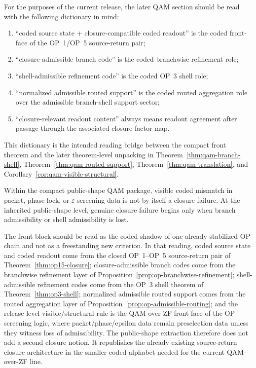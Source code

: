 \begin{remark}\label{rem:public-shape-reading-guide}
For the purposes of the current release, the later QAM section should be read with the following dictionary in mind:
\begin{enumerate}[leftmargin=2em]
 \item ``coded source state + closure-compatible coded readout'' is the coded front-face of the OP~1/OP~5 source-return pair;
 \item ``closure-admissible branch code'' is the coded branchwise refinement role;
 \item ``shell-admissible refinement code'' is the coded OP~3 shell role;
 \item ``normalized admissible routed support'' is the coded routed aggregation role over the admissible branch-shell support sector;
 \item ``closure-relevant readout content'' always means readout agreement after passage through the associated closure-factor map.
\end{enumerate}
This dictionary is the intended reading bridge between the compact front theorem and the later theorem-level unpacking in Theorem~\ref{thm:qam-branch-shell}, Theorem~\ref{thm:qam-routed-support}, Theorem~\ref{thm:qam-translation}, and Corollary~\ref{cor:qam-visible-structural}.
\end{remark}

\begin{corollary}\label{cor:release-visible-structural-rule}
Within the compact public-shape QAM package, visible coded mismatch in packet, phase-lock, or $\varepsilon$-screening data is not by itself a closure failure. At the inherited public-shape level, genuine closure failure begins only when branch admissibility or shell admissibility is lost.
\end{corollary}

\begin{remark}
The  front block should be read as the coded shadow of one already stabilized OP chain and not as a freestanding new criterion. In that reading, coded source state and coded readout come from the closed OP~1--OP~5 source-return pair of Theorem~\ref{thm:op15-closure}; closure-admissible branch codes come from the branchwise refinement layer of Proposition~\ref{prop:op-branchwise-refinement}; shell-admissible refinement codes come from the OP~3 shell theorem of Theorem~\ref{thm:op3-shell}; normalized admissible routed support comes from the routed aggregation layer of Proposition~\ref{prop:op-admissible-routing}; and the release-level visible/structural rule is the QAM-over-ZF front-face of the OP screening logic, where packet/phase/epsilon data remain preselection data unless they witness loss of admissibility. The public-shape extraction therefore does not add a second closure notion. It republishes the already existing source-return closure architecture in the smaller coded alphabet needed for the current QAM-over-ZF line.
\end{remark}

